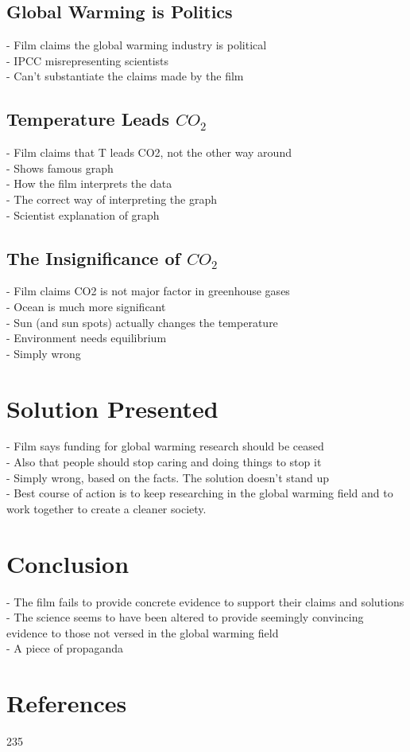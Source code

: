 \documentclass[12pt]{article}
\begin{document}
\subsection{Global Warming is Politics}	
	- Film claims the global warming industry is political\\
	- IPCC misrepresenting scientists\\
	- Can't substantiate the claims made by the film\\
\subsection{Temperature Leads $CO_2$}
	- Film claims that T leads CO2, not the other way around\\
	- Shows famous graph\\
	- How the film interprets the data\\
	- The correct way of interpreting the graph\\
	- Scientist explanation of graph\\
\subsection{The Insignificance of $CO_2$}
	- Film claims CO2 is not major factor in greenhouse gases\\
	- Ocean is much more significant\\
	- Sun (and sun spots) actually changes the temperature\\
	- Environment needs equilibrium\\
	- Simply wrong \\
\section{Solution Presented}
	- Film says funding for global warming research should be ceased\\
	- Also that people should stop caring and doing things to stop it\\
	- Simply wrong, based on the facts. The solution doesn't stand up\\
	- Best course of action is to keep researching in the global warming field and to work together to create a cleaner society.\\
\section{Conclusion}
	- The film fails to provide concrete evidence to support their claims and solutions\\
	- The science seems to have been altered to provide seemingly convincing evidence to those not versed in the global warming field \\
	- A piece of propaganda \\
\section{References}
235
\end{document}
